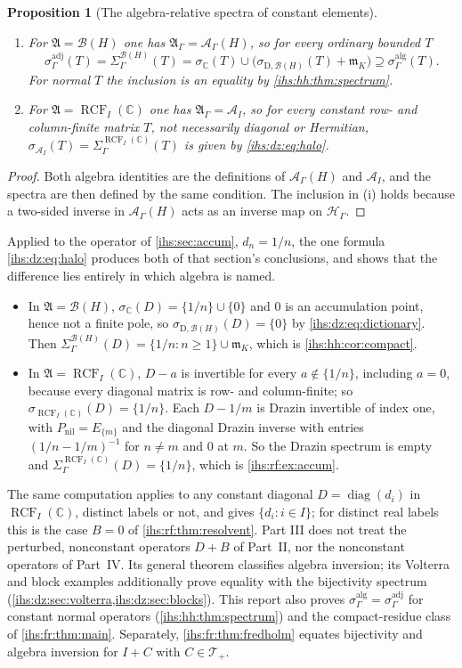 \documentclass[11pt,a4paper]{article}
\numberwithin{equation}{section}
\newtheorem{proposition}[proposition]{Proposition}
\theoremstyle{definition}
\theoremstyle{remark}
\newcommand{\C}{\mathbb C}
\newcommand{\mK}{\mathfrak m_K}
\newcommand{\Hil}{\mathcal H_\Gamma}
\newcommand{\B}{\mathcal B(H)}
\newcommand{\Ahh}{\mathcal A_\Gamma(H)}
\newcommand{\Arf}{\mathcal A_I}
\newcommand{\diag}{\operatorname{diag}}
\newcommand{\RCF}{\operatorname{RCF}}
\newcommand{\Alg}{\mathfrak A}
\newcommand{\AlgG}{\mathfrak A_\Gamma}
\newcommand{\TT}{\mathscr T}
\begin{document}
\begin{proposition}[The algebra-relative spectra of constant elements]\label{ihs:prop:unify}
\begin{enumerate}[label=\textup{(\roman*)}]
\item For $\Alg=\B$ one has $\AlgG=\Ahh$, so for every ordinary bounded $T$
\[
 \sigma^{\mathrm{adj}}_\Gamma(T)=\Sigma^{\B}_\Gamma(T)
 =\sigma_\C(T)\cup\bigl(\sigma_{\mathrm D,\B}(T)+\mK\bigr)
 \supseteq\sigma^{\mathrm{alg}}_\Gamma(T).
\]
For normal $T$ the inclusion is an equality by \cref{ihs:hh:thm:spectrum}.
\item For $\Alg=\RCF_I(\C)$ one has $\AlgG=\Arf$, so for every constant
row- and column-finite matrix $T$, not necessarily diagonal or Hermitian,
$\sigma_{\Arf}(T)=\Sigma^{\RCF_I(\C)}_\Gamma(T)$ is given by
\eqref{ihs:dz:eq:halo}.
\end{enumerate}
\end{proposition}
\begin{proof}
Both algebra identities are the definitions of $\Ahh$ and $\Arf$, and the
spectra are then defined by the same condition. The inclusion in (i) holds
because a two-sided inverse in $\Ahh$ acts as an inverse map on $\Hil$.
\end{proof}

Applied to the operator of \cref{ihs:sec:accum}, $d_n=1/n$, the one formula
\eqref{ihs:dz:eq:halo} produces both of that section's conclusions, and
shows that the difference lies entirely in which algebra is named.
\begin{itemize}
\item In $\Alg=\B$, $\sigma_\C(D)=\{1/n\}\cup\{0\}$ and $0$ is an
accumulation point, hence not a finite pole, so
$\sigma_{\mathrm D,\B}(D)=\{0\}$ by \eqref{ihs:dz:eq:dictionary}. Then
$\Sigma^{\B}_\Gamma(D)=\{1/n:n\ge1\}\cup\mK$, which is
\cref{ihs:hh:cor:compact}.
\item In $\Alg=\RCF_I(\C)$, $D-a$ is invertible for every
$a\notin\{1/n\}$, including $a=0$, because every diagonal matrix is row- and
column-finite; so $\sigma_{\RCF_I(\C)}(D)=\{1/n\}$. Each $D-1/m$ is Drazin
invertible of index one, with $P_{\mathrm{nil}}=E_{\{m\}}$ and the diagonal
Drazin inverse with entries $(1/n-1/m)^{-1}$ for $n\ne m$ and $0$ at $m$. So
the Drazin spectrum is empty and $\Sigma^{\RCF_I(\C)}_\Gamma(D)=\{1/n\}$,
which is \cref{ihs:rf:ex:accum}.
\end{itemize}
The same computation applies to any constant diagonal $D=\diag(d_i)$ in
$\RCF_I(\C)$, distinct labels or not, and gives $\{d_i:i\in I\}$; for
distinct real labels this is the case $B=0$ of
\cref{ihs:rf:thm:resolvent}. Part III does not treat the perturbed,
nonconstant operators $D+B$ of Part~II, nor the nonconstant operators of
Part~IV. Its general theorem classifies algebra inversion; its Volterra
and block examples additionally prove equality with the bijectivity spectrum
(\cref{ihs:dz:sec:volterra,ihs:dz:sec:blocks}). This report also proves
$\sigma^{\mathrm{alg}}_\Gamma=\sigma^{\mathrm{adj}}_\Gamma$ for constant
normal operators (\cref{ihs:hh:thm:spectrum}) and the compact-residue class
of \cref{ihs:fr:thm:main}. Separately, \cref{ihs:fr:thm:fredholm} equates
bijectivity and algebra inversion for $I+C$ with $C\in\TT_+$.
\end{document}
